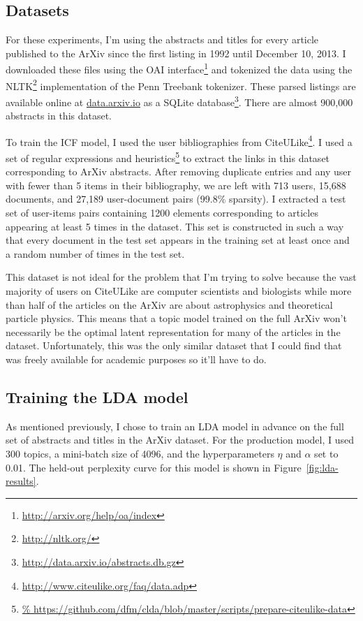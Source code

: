 \documentclass[11pt]{article}
\newcommand{\fig}[1]{Figure~\ref{fig:#1}}
\begin{document}
\subsection{Datasets}

For these experiments, I'm using the abstracts and titles for every article
published to the ArXiv since the first listing in 1992 until December 10,
2013.
I downloaded these files using the OAI
interface\footnote{\url{http://arxiv.org/help/oa/index}} and tokenized the
data using the NLTK\footnote{\url{http://nltk.org/}} implementation of the
Penn Treebank tokenizer.
These parsed listings are available online at \url{data.arxiv.io} as a SQLite
database\footnote{\url{http://data.arxiv.io/abstracts.db.gz}}.
There are almost 900,000 abstracts in this dataset.

To train the ICF model, I used the user bibliographies from
CiteULike\footnote{\url{http://www.citeulike.org/faq/data.adp}}.
I used a set of regular expressions and
heuristics\footnote{\url{%
https://github.com/dfm/clda/blob/master/scripts/prepare-citeulike-data}} to
extract the links in this dataset corresponding to ArXiv abstracts.
After removing duplicate entries and any user with fewer than 5 items in their
bibliography, we are left with 713 users, 15,688 documents, and 27,189
user-document pairs (99.8\% sparsity).
I extracted a test set of user-items pairs containing 1200 elements
corresponding to articles appearing at least 5 times in the dataset.
This set is constructed in such a way that every document in the test set
appears in the training set at least once and a random number of times in the
test set.

This dataset is not ideal for the problem that I'm trying to solve because the
vast majority of users on CiteULike are computer scientists and biologists
while more than half of the articles on the ArXiv are about astrophysics and
theoretical particle physics.
This means that a topic model trained on the full ArXiv won't necessarily be
the optimal latent representation for many of the articles in the dataset.
Unfortunately, this was the only similar dataset that I could find that was
freely available for academic purposes so it'll have to do.

\subsection{Training the LDA model}

As mentioned previously, I chose to train an LDA model in advance on the full
set of abstracts and titles in the ArXiv dataset.
For the production model, I used 300 topics, a mini-batch size of 4096, and
the hyperparameters $\eta$ and $\alpha$ set to 0.01.
The held-out perplexity curve for this model is shown in \fig{lda-results}.
\end{document}
